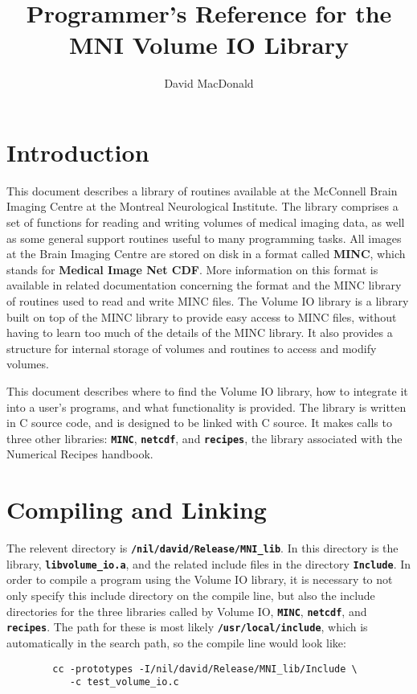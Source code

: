 
\title{Programmer's Reference for the MNI Volume IO Library}
\author{David MacDonald}

\newcommand{\path}{{\bf\tt /nil/david/Release/MNI\_lib}}
\newcommand{\name}[1]{{\bf\tt #1}}
\newcommand{\savelength}{}



\maketitle

\newpage

\tableofcontents

\newpage

\section{Introduction}

This document describes a library of routines available at the
McConnell Brain Imaging Centre at the Montreal Neurological Institute.
The library comprises a set of functions for reading and writing
volumes of medical imaging data, as well as some general support
routines useful to many programming tasks.  All images at the Brain
Imaging Centre are stored on disk in a format called {\bf MINC}, which
stands for {\bf Medical Image Net CDF}.  More information on this
format is available in related documentation concerning the format and
the MINC library of routines used to read and write MINC files.  The
Volume IO library is a library built on top of the MINC library to
provide easy access to MINC files, without having to learn too much of
the details of the MINC library.  It also provides a structure for internal
storage of volumes and routines to access and modify volumes.

This document describes where to find the Volume IO library, how to
integrate it into a user's programs, and what functionality
is provided.  The library is written in C source code, and is designed
to be linked with C source.  It makes calls to three other libraries:
\name{MINC}, \name{netcdf}, and \name{recipes}, the library associated
with the Numerical Recipes handbook.

\section{Compiling and Linking}

The relevent directory is \path.  In this directory is the library,
\name{libvolume\_io.a}, and the related include files in the directory
\name{Include}.  In order to compile a program using the Volume IO
library, it is necessary to not only specify this include directory on
the compile line, but also the include directories for the three
libraries called by Volume IO, \name{MINC}, \name{netcdf}, and
\name{recipes}.  The path for these is most likely \name{/usr/local/include},
which is automatically in the search path, so the compile line would look like:
\begin{verbatim}
        cc -prototypes -I/nil/david/Release/MNI_lib/Include \
           -c test_volume_io.c
\end{verbatim}

